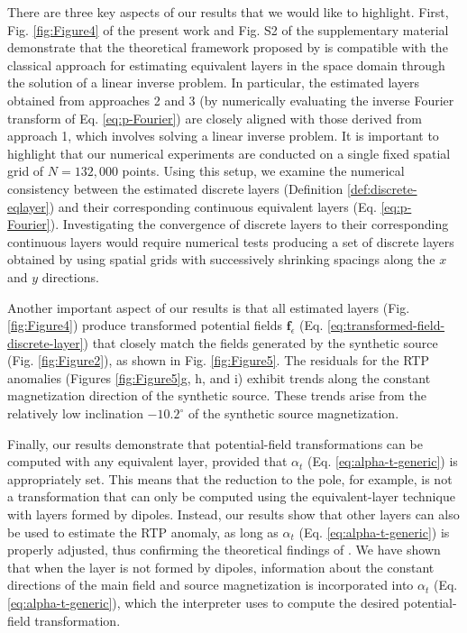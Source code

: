 There are three key aspects of our results that we would like to highlight.
First, Fig. \ref{fig:Figure4} of the present work and Fig. S2 of the supplementary 
material demonstrate that the theoretical framework proposed by \cite{oliveirajr_etal2026_1} 
is compatible with the classical approach for estimating equivalent layers in the space 
domain through the solution of a linear inverse problem.
In particular, the estimated layers obtained from approaches 2 and 3 
(by numerically evaluating the inverse Fourier transform of Eq. \ref{eq:p-Fourier}) 
are closely aligned with those derived from approach 1, which involves solving a linear inverse problem.
It is important to highlight that our numerical experiments are conducted on a single fixed spatial grid
of $N = 132,000$ points. Using this setup, we examine the numerical consistency between the estimated discrete 
layers (Definition \ref{def:discrete-eqlayer}) and their corresponding continuous equivalent layers (Eq. \ref{eq:p-Fourier}).
Investigating the convergence of discrete layers to their corresponding continuous layers would require
numerical tests producing a set of discrete layers obtained by using spatial grids with successively 
shrinking spacings along the $x$ and $y$ directions.

Another important aspect of our results is that all estimated layers (Fig. 
\ref{fig:Figure4}) produce transformed potential fields $\mathbf{f}_{\epsilon}$ (Eq. 
\ref{eq:transformed-field-discrete-layer}) that closely match the fields generated by the 
synthetic source (Fig. \ref{fig:Figure2}), as shown in Fig. \ref{fig:Figure5}. The 
residuals for the RTP anomalies (Figures \ref{fig:Figure5}g, h, and i) exhibit trends along 
the constant magnetization direction of the synthetic source. These trends arise from the 
relatively low inclination $-10.2^{\circ}$ of the synthetic source magnetization.

Finally, our results demonstrate that potential-field transformations can be computed with any 
equivalent layer, provided that $\alpha_{t}$ (Eq. \ref{eq:alpha-t-generic}) is appropriately 
set. This means that the reduction to the pole, for example, is not a transformation that can only 
be computed using the equivalent-layer technique with layers formed by dipoles. Instead, our 
results show that other layers can also be used to estimate the RTP anomaly, as long as $\alpha_{t}$ 
(Eq. \ref{eq:alpha-t-generic}) is properly adjusted, thus confirming the theoretical 
findings of \cite{oliveirajr_etal2026_1}. 
We have shown that when the layer is not formed by dipoles, information about the constant directions 
of the main field and source magnetization is incorporated into $\alpha_{t}$ 
(Eq. \ref{eq:alpha-t-generic}), which the interpreter uses to compute the desired 
potential-field transformation.

